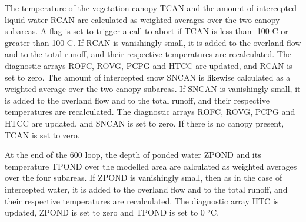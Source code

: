 The temperature of the vegetation canopy T\+C\+A\+N and the amount of intercepted liquid water R\+C\+A\+N are calculated as weighted averages over the two canopy subareas. A flag is set to trigger a call to abort if T\+C\+A\+N is less than -\/100 C or greater than 100 C. If R\+C\+A\+N is vanishingly small, it is added to the overland flow and to the total runoff, and their respective temperatures are recalculated. The diagnostic arrays R\+O\+F\+C, R\+O\+V\+G, P\+C\+P\+G and H\+T\+C\+C are updated, and R\+C\+A\+N is set to zero. The amount of intercepted snow S\+N\+C\+A\+N is likewise calculated as a weighted average over the two canopy subareas. If S\+N\+C\+A\+N is vanishingly small, it is added to the overland flow and to the total runoff, and their respective temperatures are recalculated. The diagnostic arrays R\+O\+F\+C, R\+O\+V\+G, P\+C\+P\+G and H\+T\+C\+C are updated, and S\+N\+C\+A\+N is set to zero. If there is no canopy present, T\+C\+A\+N is set to zero.

At the end of the 600 loop, the depth of ponded water Z\+P\+O\+N\+D and its temperature T\+P\+O\+N\+D over the modelled area are calculated as weighted averages over the four subareas. If Z\+P\+O\+N\+D is vanishingly small, then as in the case of intercepted water, it is added to the overland flow and to the total runoff, and their respective temperatures are recalculated. The diagnostic array H\+T\+C is updated, Z\+P\+O\+N\+D is set to zero and T\+P\+O\+N\+D is set to 0 $^o$C.

